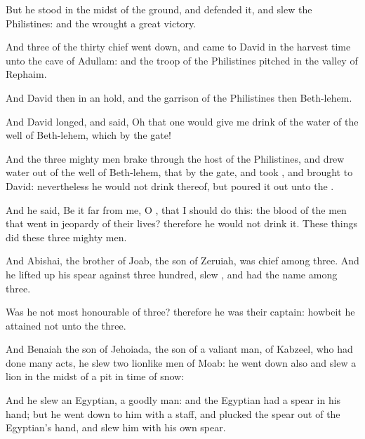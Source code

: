 {But he
stood in the
midst of the
ground, and
defended it, and
slew the
Philistines: and the
{}
wrought a
great
victory.

And
three of the
thirty
chief went
down, and
came to
David in the harvest
time unto the
cave of
Adullam: and the
troop of the
Philistines
pitched in the
valley of
Rephaim.

And
David
{} then in an
hold, and the
garrison of the
Philistines
{} then
{}
Beth-lehem.

And
David
longed, and
said, Oh that one would give me
drink of the
water of the
well of
Beth-lehem, which
{} by the
gate!

And the
three mighty
men brake
through the
host of the
Philistines, and
drew
water out of the
well of
Beth-lehem, that
{} by the
gate, and
took
{}, and
brought
{} to
David: nevertheless he
would not
drink thereof, but poured it
out unto the
{}.

And he
said, Be it
far from me, O
{}, that I should
do this:
{} the
blood of the
men that
went in jeopardy of their
lives? therefore he
would not
drink it. These things
did these
three mighty
men.

And
Abishai, the
brother of
Joab, the
son of
Zeruiah, was
chief among
three. And he lifted
up his
spear against
three
hundred,
{}
slew
{}, and had the
name among
three.

Was he not most
honourable of
three? therefore he was their
captain: howbeit he
attained not unto the
{}
three.

And
Benaiah the
son of
Jehoiada, the
son of a
valiant
man, of
Kabzeel, who had done
many
acts, he
slew
two lionlike
men of
Moab: he went
down also and
slew a
lion in the
midst of a
pit in
time of
snow:

And he
slew an
Egyptian, a
goodly
man: and the
Egyptian had a
spear in his
hand; but he went
down to him with a
staff, and
plucked the
spear out of the
Egyptian’s
hand, and
slew him with his own
spear.

}

